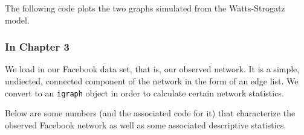 \documentclass[12pt,twoside]{amherstthesis}
\begin{document}
  The following code plots the two graphs simulated from the
  Watts-Strogatz model.
  
  \begin{Shaded}
  \begin{Highlighting}[]
  \NormalTok{(}\NormalTok{(}\NormalTok{,}\NormalTok{))}
   \NormalTok{, } \NormalTok{)}
   \NormalTok{, } \NormalTok{, }
  \end{Highlighting}
  \end{Shaded}
  
  \subsubsection{In Chapter 3}\label{in-chapter-3}
  
  We load in our Facebook data set, that is, our observed network. It is a
  simple, undiected, connected component of the network in the form of an
  edge list. We convert to an \texttt{igraph} object in order to calculate
  certain network statistics.
  
  \begin{Shaded}
  \begin{Highlighting}[]
  \NormalTok{(}\NormalTok{)}
  
  \StringTok{ }\NormalTok{(}\NormalTok{(}\NormalTok{), } 
  
  \StringTok{ }
  \end{Highlighting}
  \end{Shaded}
  
  Below are some numbers (and the associated code for it) that
  characterize the observed Facebook network as well as some associated
  descriptive statistics.
  
\end{document}
